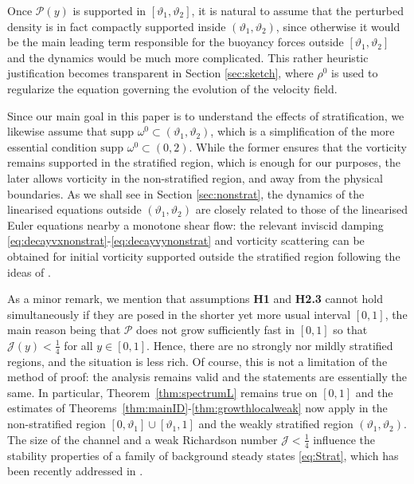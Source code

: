 \documentclass[11pt,reqno]{amsproc}
\theoremstyle{definition}
\numberwithin{equation}{section}
\newcommand{\cJ}{{\mathcal{J}}}
\renewcommand{\P}{{\mathcal{P}}}
\begin{document}
Once $\P(y)$ is supported in $[\vartheta_1, \vartheta_2]$, it is natural to assume that the perturbed density is in fact compactly supported inside $(\vartheta_1,\vartheta_2)$, since otherwise it would be the main leading term responsible for the buoyancy forces outside $[\vartheta_1,\vartheta_2]$ and the dynamics would be much more complicated. This rather heuristic justification becomes transparent in Section \ref{sec:sketch}, where $\rho^0$  is used to regularize the equation governing the evolution of the velocity field.

Since our main goal in this paper is to understand the effects of stratification, we likewise assume that $\text{supp } \omega^0 \subset (\vartheta_1,\vartheta_2)$, which is a simplification of the more essential condition $\text{supp } \omega^0 \subset (0,2)$. While the former ensures that the vorticity remains supported in the stratified region, which is enough for our purposes, the later allows vorticity in the non-stratified region, and away from the physical boundaries. As we shall see in Section \ref{sec:nonstrat}, the dynamics of the linearised equations outside $(\vartheta_1,\vartheta_2)$ are closely related to those of the linearised Euler equations nearby a monotone shear flow: the relevant inviscid damping \eqref{eq:decayvxnonstrat}-\eqref{eq:decayvynonstrat} and vorticity scattering can be obtained for initial vorticity supported outside the stratified region following the ideas of \cites{Jia20, JiaGev20}.

{As a minor remark, we mention that assumptions \textbf{H1} and \textbf{H2.3} cannot hold simultaneously if they are posed in the shorter yet more usual interval $[0,1]$, the main reason being that $\P$ does not grow sufficiently fast in $[0,1]$ so that $\cJ(y) < \frac14$ for all $y\in[0,1]$. Hence, there are no strongly nor mildly stratified regions, and the situation is less rich. Of course, this is not a limitation of the method of proof:  the analysis remains valid and the statements are essentially the same. In particular, Theorem~\ref{thm:spectrumL} remains true on $[0,1]$ and the estimates of Theorems~\ref{thm:mainID}-\ref{thm:growthlocalweak} now apply in the non-stratified region $[0,\vartheta_1]\cup[\vartheta_1,1]$ and the weakly stratified region $(\vartheta_1,\vartheta_2)$. The size of the channel and a weak Richardson number $\cJ < \frac14$ influence the stability properties of a family of background steady states \eqref{eq:Strat}, which has been recently addressed in \cite{bianchini2025ill}.}
\end{document}
